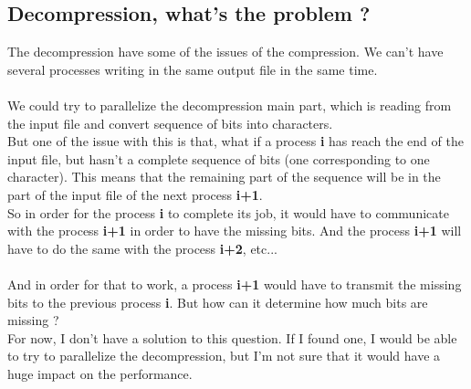 \subsection{Decompression, what's the problem ?}
The decompression have some of the issues of the compression. We can't have several processes writing in the same output file in the same time.\\
\\
We could try to parallelize the decompression main part, which is reading from the input file and convert sequence of bits into characters.\\
But one of the issue with this is that, what if a process \textbf{i} has reach the end of the input file, but hasn't a complete sequence of bits (one corresponding to one character). This means that the remaining part of the sequence will be in the part of the input file of the next process \textbf{i+1}.\\
So in order for the process \textbf{i} to complete its job, it would have to communicate with the process \textbf{i+1} in order to have the missing bits. And the process \textbf{i+1} will have to do the same with the process \textbf{i+2}, etc...\\
\\
And in order for that to work, a process \textbf{i+1} would have to transmit the missing bits to the previous process \textbf{i}. But how can it determine how much bits are missing ?\\
For now, I don't have a solution to this question. If I found one, I would be able to try to parallelize the decompression, but I'm not sure that it would have a huge impact on the performance.


